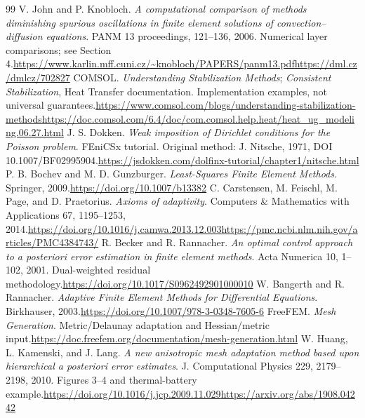 \documentclass[11pt,a4paper]{article}
\begin{document}
\begin{thebibliography}{99}
 V. John and P. Knobloch. \emph{A computational comparison of methods diminishing spurious oscillations in finite element solutions of convection--diffusion equations}. PANM 13 proceedings, 121--136, 2006. Numerical layer comparisons; see Section 4.\newline\url{https://www.karlin.mff.cuni.cz/~knobloch/PAPERS/panm13.pdf}\newline\url{https://dml.cz/dmlcz/702827}
 COMSOL. \emph{Understanding Stabilization Methods}; \emph{Consistent Stabilization}, Heat Transfer documentation. Implementation examples, not universal guarantees.\newline\url{https://www.comsol.com/blogs/understanding-stabilization-methods}\newline\url{https://doc.comsol.com/6.4/doc/com.comsol.help.heat/heat_ug_modeling.06.27.html}
 J. S. Dokken. \emph{Weak imposition of Dirichlet conditions for the Poisson problem}. FEniCSx tutorial. Original method: J. Nitsche, 1971, DOI 10.1007/BF02995904.\newline\url{https://jsdokken.com/dolfinx-tutorial/chapter1/nitsche.html}
 P. B. Bochev and M. D. Gunzburger. \emph{Least-Squares Finite Element Methods}. Springer, 2009.\newline\url{https://doi.org/10.1007/b13382}
 C. Carstensen, M. Feischl, M. Page, and D. Praetorius. \emph{Axioms of adaptivity}. Computers \& Mathematics with Applications 67, 1195--1253, 2014.\newline\url{https://doi.org/10.1016/j.camwa.2013.12.003}\newline\url{https://pmc.ncbi.nlm.nih.gov/articles/PMC4384743/}
 R. Becker and R. Rannacher. \emph{An optimal control approach to a posteriori error estimation in finite element methods}. Acta Numerica 10, 1--102, 2001. Dual-weighted residual methodology.\newline\url{https://doi.org/10.1017/S0962492901000010}
 W. Bangerth and R. Rannacher. \emph{Adaptive Finite Element Methods for Differential Equations}. Birkhauser, 2003.\newline\url{https://doi.org/10.1007/978-3-0348-7605-6}
 FreeFEM. \emph{Mesh Generation}. Metric/Delaunay adaptation and Hessian/metric input.\newline\url{https://doc.freefem.org/documentation/mesh-generation.html}
 W. Huang, L. Kamenski, and J. Lang. \emph{A new anisotropic mesh adaptation method based upon hierarchical a posteriori error estimates}. J. Computational Physics 229, 2179--2198, 2010. Figures 3--4 and thermal-battery example.\newline\url{https://doi.org/10.1016/j.jcp.2009.11.029}\newline\url{https://arxiv.org/abs/1908.04242}

\end{thebibliography}
\end{document}
